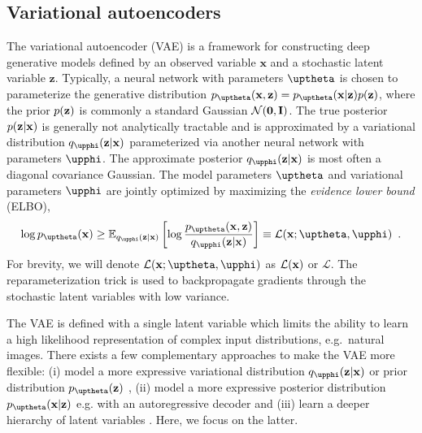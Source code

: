 {\subsection{Variational autoencoders}
The variational autoencoder (VAE) \parencite{kingma_autoencoding_2014, rezende_stochastic_2014} is a framework for constructing deep generative models defined by an observed variable $\mathbf{x}$ and a stochastic latent variable $\mathbf{z}$.
Typically, a neural network with parameters $\thetab$ is chosen to parameterize the generative distribution $p_\thetab(\xb,\zb)=p_\thetab(\xb|\zb)p(\zb)$, where the prior $p({\mathbf{z}})$ is commonly a standard Gaussian $\mathcal{N}({\mathbf{0}}, {\mathbf{I}})$.
The true posterior $p({\mathbf{z}}|{\mathbf{x}})$ is generally not analytically tractable and is approximated by a variational distribution $q_\phib(\zb|\xb)$ parameterized via another neural network with parameters $\phib$. The approximate posterior $q_\phib(\zb|\xb)$ is most often  a diagonal covariance Gaussian.
The model parameters $\thetab$ and variational parameters $\phib$ are jointly optimized by maximizing the \textit{evidence lower bound} (ELBO),
\begin{equation}\label{eq_hierarchical:elbo}
    \log p_\thetab(\xb) \geq \mathbb{E}_{q_\phib(\zb|\xb)} \left[ \log \frac{p_\thetab(\xb,\zb)}{q_\phib(\zb|\xb)} \right] \equiv \mathcal{L}(\xb; \thetab, \phib) \enspace .
\end{equation}
For brevity, we will denote $\mathcal{L}(\xb; \thetab, \phib)$ as $\mathcal{L}({\mathbf{x}})$ or $\mathcal{L}$. The reparameterization trick is used to backpropagate gradients through the stochastic latent variables with low variance.

The VAE is defined with a single latent variable which limits the ability to learn a high likelihood representation of complex input distributions, e.g.\ natural images.
There exists a few complementary approaches to make the VAE more flexible: (i) model a more expressive variational distribution $q_\phib(\zb|\xb)$ or prior distribution $p_\thetab(\zb)$ \parencite{rezende_variational_2015, kingma_improved_2016}, (ii) model a more expressive posterior distribution $p_\thetab(\xb|\zb)$ e.g. with an autoregressive decoder \parencite{oord_conditional_2016} and (iii) learn a deeper hierarchy of latent variables \parencite{burda_importance_2016, sonderby_ladder_2016}.
Here, we focus on the latter.


}
